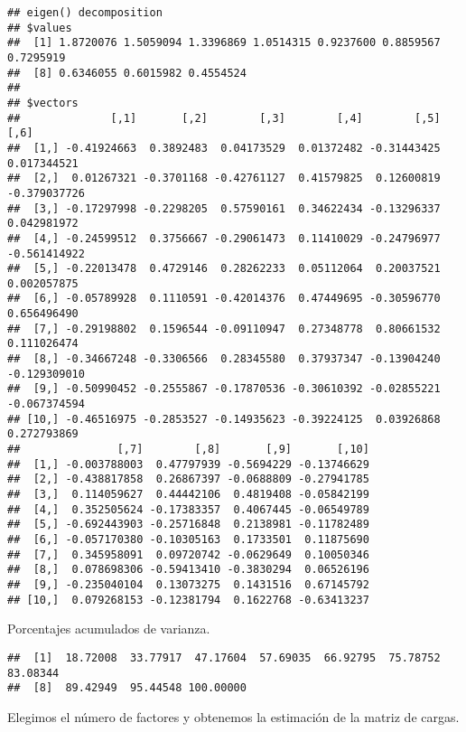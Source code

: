 \documentclass[
]{article}
\newenvironment{Shaded}{\begin{snugshade}}{\end{snugshade}}
\newcommand{\DecValTok}[1]{\textcolor[rgb]{0.00,0.00,0.81}{#1}}
\newcommand{\FunctionTok}[1]{\textcolor[rgb]{0.00,0.00,0.00}{#1}}
\newcommand{\NormalTok}[1]{#1}
\newcommand{\SpecialCharTok}[1]{\textcolor[rgb]{0.00,0.00,0.00}{#1}}
\begin{document}
\begin{verbatim}
## eigen() decomposition
## $values
##  [1] 1.8720076 1.5059094 1.3396869 1.0514315 0.9237600 0.8859567 0.7295919
##  [8] 0.6346055 0.6015982 0.4554524
## 
## $vectors
##              [,1]       [,2]        [,3]        [,4]        [,5]         [,6]
##  [1,] -0.41924663  0.3892483  0.04173529  0.01372482 -0.31443425  0.017344521
##  [2,]  0.01267321 -0.3701168 -0.42761127  0.41579825  0.12600819 -0.379037726
##  [3,] -0.17297998 -0.2298205  0.57590161  0.34622434 -0.13296337  0.042981972
##  [4,] -0.24599512  0.3756667 -0.29061473  0.11410029 -0.24796977 -0.561414922
##  [5,] -0.22013478  0.4729146  0.28262233  0.05112064  0.20037521  0.002057875
##  [6,] -0.05789928  0.1110591 -0.42014376  0.47449695 -0.30596770  0.656496490
##  [7,] -0.29198802  0.1596544 -0.09110947  0.27348778  0.80661532  0.111026474
##  [8,] -0.34667248 -0.3306566  0.28345580  0.37937347 -0.13904240 -0.129309010
##  [9,] -0.50990452 -0.2555867 -0.17870536 -0.30610392 -0.02855221 -0.067374594
## [10,] -0.46516975 -0.2853527 -0.14935623 -0.39224125  0.03926868  0.272793869
##               [,7]        [,8]       [,9]       [,10]
##  [1,] -0.003788003  0.47797939 -0.5694229 -0.13746629
##  [2,] -0.438817858  0.26867397 -0.0688809 -0.27941785
##  [3,]  0.114059627  0.44442106  0.4819408 -0.05842199
##  [4,]  0.352505624 -0.17383357  0.4067445 -0.06549789
##  [5,] -0.692443903 -0.25716848  0.2138981 -0.11782489
##  [6,] -0.057170380 -0.10305163  0.1733501  0.11875690
##  [7,]  0.345958091  0.09720742 -0.0629649  0.10050346
##  [8,]  0.078698306 -0.59413410 -0.3830294  0.06526196
##  [9,] -0.235040104  0.13073275  0.1431516  0.67145792
## [10,]  0.079268153 -0.12381794  0.1622768 -0.63413237
\end{verbatim}

Porcentajes acumulados de varianza.

\begin{Shaded}
\end{Shaded}

\begin{verbatim}
##  [1]  18.72008  33.77917  47.17604  57.69035  66.92795  75.78752  83.08344
##  [8]  89.42949  95.44548 100.00000
\end{verbatim}

Elegimos el número de factores y obtenemos la estimación de la matriz de
cargas.
\end{document}
